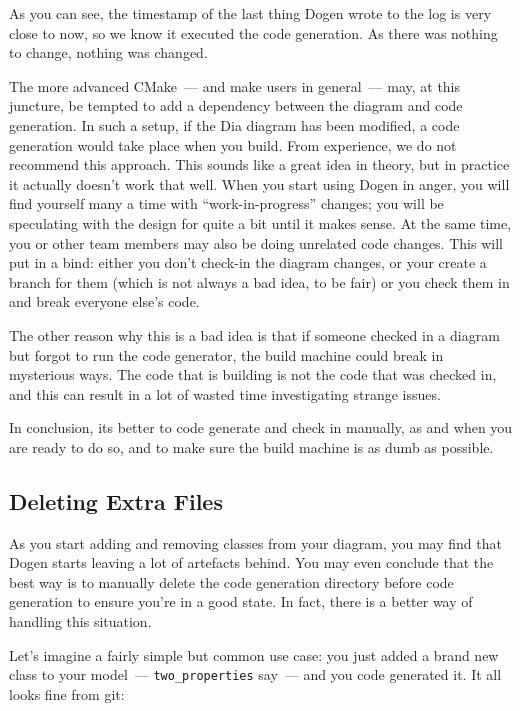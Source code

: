 \documentclass{book}
\begin{document}
As you can see, the timestamp of the last thing Dogen wrote to the log
is very close to now, so we know it executed the code generation.  As
there was nothing to change, nothing was changed.

The more advanced CMake~--- and make users in general~--- may, at this
juncture, be tempted to add a dependency between the diagram and code
generation. In such a setup, if the Dia diagram has been modified, a
code generation would take place when you build. From experience, we
do not recommend this approach. This sounds like a great idea in
theory, but in practice it actually doesn't work that well. When you
start using Dogen in anger, you will find yourself many a time with
``work-in-progress'' changes; you will be speculating with the design
for quite a bit until it makes sense. At the same time, you or other
team members may also be doing unrelated code changes. This will put
in a bind: either you don't check-in the diagram changes, or your
create a branch for them (which is not always a bad idea, to be fair)
or you check them in and break everyone else's code.

The other reason why this is a bad idea is that if someone checked in
a diagram but forgot to run the code generator, the build machine
could break in mysterious ways. The code that is building is not the
code that was checked in, and this can result in a lot of wasted time
investigating strange issues.

In conclusion, its better to code generate and check in manually, as
and when you are ready to do so, and to make sure the build machine is
as dumb as possible.

\subsection{Deleting Extra Files}

As you start adding and removing classes from your diagram, you may
find that Dogen starts leaving a lot of artefacts behind. You may even
conclude that the best way is to manually delete the code generation
directory before code generation to ensure you're in a good state. In
fact, there is a better way of handling this situation.

Let's imagine a fairly simple but common use case: you just added a
brand new class to your model~--- \texttt{two\_properties} say~--- and
you code generated it. It all looks fine from git:
\end{document}
